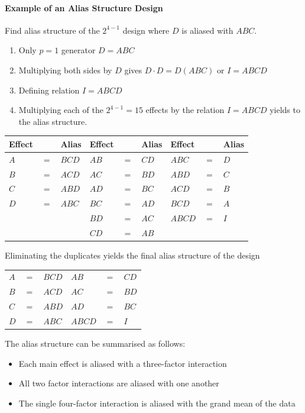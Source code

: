 \documentclass[11pt]{article}
\theoremstyle{definition}
\begin{document}
\paragraph{Example of an Alias Structure Design} Find alias structure of the $2^{4−1}$ design where $D$ is aliased with $ABC$.
\begin{enumerate}
	\item Only $p = 1$ generator $D = ABC$
	\item Multiplying both sides by $D$ gives $D \cdot D = D(ABC)$ or $I = ABCD$
	\item Defining relation $I = ABCD$
	\item Multiplying each of the $2^{4-1} = 15$ effects by the relation $I = ABCD$ yields to the alias structure.
\end{enumerate}
\begin{tabularx}{\linewidth}{l c l l c l l c l}
	Effect & & Alias & Effect & & Alias & Effect & & Alias \\
	\hline
	$A$ & $=$ & $BCD$ & $AB$ & $=$ & $CD$ & $ABC$ & $=$ & $D$ \\
	$B$ & $=$ & $ACD$ & $AC$ & $=$ & $BD$ & $ABD$ & $=$ & $C$ \\
	$C$ & $=$ & $ABD$ & $AD$ & $=$ & $BC$ & $ACD$ & $=$ & $B$ \\
	$D$ & $=$ & $ABC$ & $BC$ & $=$ & $AD$ & $BCD$ & $=$ & $A$ \\
	    &     &       & $BD$ & $=$ & $AC$ & $ABCD$ &$=$ & $I$ \\
	    &     &       & $CD$ & $=$ & $AB$ &
\end{tabularx}
Eliminating the duplicates yields the final alias structure of the design
\begin{tabularx}{\linewidth}{l c l l c l }
	$A$ & $=$ & $BCD$ & $AB$ & $=$ & $CD$ \\
	$B$ & $=$ & $ACD$ & $AC$ & $=$ & $BD$ \\
	$C$ & $=$ & $ABD$ & $AD$ & $=$ & $BC$ \\
	$D$ & $=$ & $ABC$ & $ABCD$ & $=$ & $I$
\end{tabularx}
The alias structure can be summarised as follows:
\begin{itemize}[nosep]
	\item Each main effect is aliased with a three-factor interaction
	\item All two factor interactions are aliased with one another
	\item The single four-factor interaction is aliased with the grand mean of the data
\end{itemize}
\end{document}
